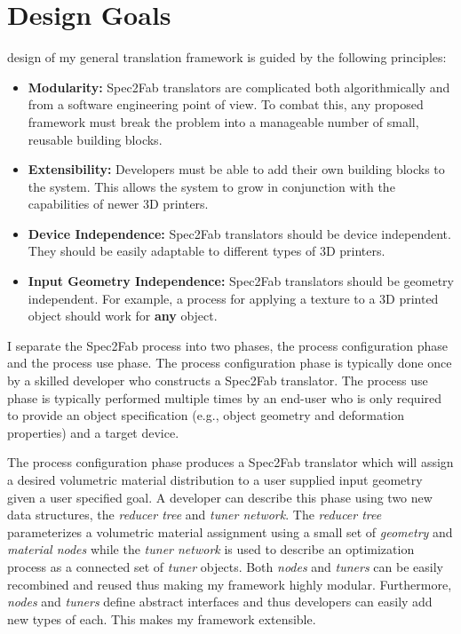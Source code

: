 \chapter{Design Goals}
\label{chap:design}
 design of my general translation framework is guided by the following principles:

\begin{itemize}

\item \textbf{Modularity:} Spec2Fab translators are complicated both algorithmically and from a software engineering point of view. To combat this, any proposed framework must break the problem into a manageable number of small, reusable building blocks. 

\item \textbf{Extensibility:} Developers must be able to add their own building blocks to the system. This allows the system to grow in conjunction with the capabilities of newer 3D printers.
\vspace{-0.25\baselineskip}

\item \textbf{Device Independence:} Spec2Fab translators should be device independent. They should be easily adaptable to different types of 3D printers.
\item \textbf{Input Geometry Independence:} Spec2Fab translators should be geometry independent. For example, a process for applying a texture to a 3D printed object should work for \textbf{any} object.
\vspace{-0.25\baselineskip}
\end{itemize}

I separate the Spec2Fab process into two phases, the process configuration phase and the process use phase. The process configuration phase is typically done once by a skilled developer who  constructs a Spec2Fab translator. The process use phase is typically performed multiple times by an end-user who is only required to provide an object specification (e.g., object geometry and deformation properties) and a target device. 

The process configuration phase produces a Spec2Fab translator
which will assign a desired volumetric material distribution to a user supplied input geometry
given a user specified goal.
A developer can describe this phase using two new data structures, the \emph{reducer tree} and \emph{tuner network}. 
The \emph{reducer tree} parameterizes a volumetric material assignment using a small set of \emph{geometry} and \emph{material nodes} while the \emph{tuner network} is used to describe an optimization process as a connected set of \emph{tuner} objects.
Both \emph{nodes} and \emph{tuners} can be easily recombined and reused
thus making my framework highly modular. Furthermore,
\emph{nodes} and \emph{tuners} define abstract interfaces and thus developers can easily add new types of each.
This makes my framework extensible.
	
